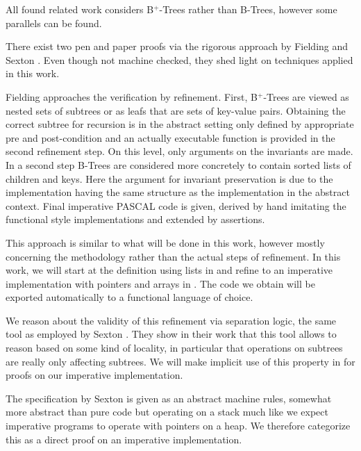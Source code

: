 All found related work considers B$^+$-Trees
rather than B-Trees, however some parallels can be found.

There exist two pen and paper proofs via the rigorous approach
by Fielding \parencite{Fielding80} and Sexton \parencite{DBLP:journals/entcs/SextonT08}.
Even though not machine checked, they shed light on techniques applied in this work.

Fielding approaches the verification by refinement.
First, B$^+$-Trees are viewed as nested sets of subtrees
or as leafs that are sets of key-value pairs.
Obtaining the correct subtree for recursion is in the abstract setting
only defined by appropriate pre and post-condition
and an actually executable function is provided in the second refinement step.
On this level, only arguments on the invariants are made.
In a second step B-Trees are considered more concretely to contain
sorted lists of children and keys.
Here the argument for invariant preservation is due to the implementation
having the same structure as the implementation in the abstract context.
Final imperative PASCAL code is given, derived by hand
imitating the functional style implementations and extended by assertions.

This approach is similar to what will be done in this work,
however mostly concerning the methodology rather than the actual
steps of refinement.
In this work, we will start at the definition using lists in 
and refine to an imperative implementation with pointers and arrays in .
The code we obtain will be exported automatically to a functional language of choice.

We reason about the validity of this refinement via separation logic,
the same tool as employed by Sexton \parencite{DBLP:journals/entcs/SextonT08}.
They show in their work that this tool allows to reason based on some kind of locality,
in particular that operations on subtrees are really only affecting subtrees.
We will make implicit use of this property in 
for proofs on our imperative implementation.

The specification by Sexton is given as an abstract machine rules,
somewhat more abstract than pure code but operating on a stack
much like we expect imperative programs to operate with pointers on a heap.
We therefore categorize this as a direct proof on an imperative implementation.

